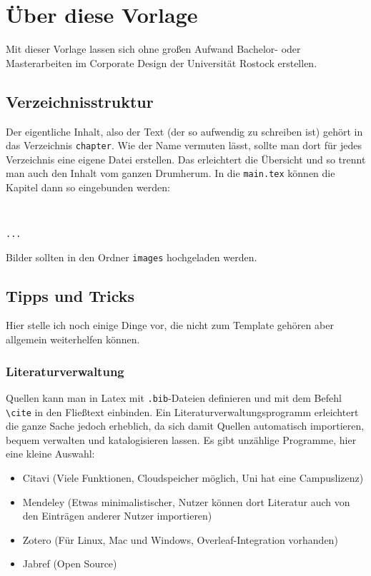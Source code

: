 \chapter{Über diese Vorlage}

Mit dieser Vorlage lassen sich ohne großen Aufwand Bachelor- oder Masterarbeiten im Corporate Design der Universität Rostock erstellen.
\section{Verzeichnisstruktur}
Der eigentliche Inhalt, also der Text (der so aufwendig zu schreiben ist) gehört in das Verzeichnis \texttt{chapter}. Wie der Name vermuten lässt, sollte man dort für jedes Verzeichnis eine eigene Datei erstellen. Das erleichtert die Übersicht und so trennt man auch den Inhalt vom ganzen Drumherum. In die \texttt{main.tex} können die Kapitel dann so eingebunden werden:

\begin{lstlisting}


...

\end{lstlisting}

Bilder sollten in den Ordner \texttt{images} hochgeladen werden.

\section{Tipps und Tricks}
Hier stelle ich noch einige Dinge vor, die nicht zum Template gehören aber allgemein weiterhelfen können.

\subsection{Literaturverwaltung}
Quellen kann man in Latex mit \texttt{.bib}-Dateien definieren und mit dem Befehl \texttt{\textbackslash{}cite} \cite{iuk696} in den Fließtext einbinden. Ein Literaturverwaltungsprogramm erleichtert die ganze Sache jedoch erheblich, da sich damit Quellen automatisch importieren, bequem verwalten und katalogisieren lassen. Es gibt unzählige Programme, hier eine kleine Auswahl:

\begin{itemize}
    \item Citavi (Viele Funktionen, Cloudspeicher möglich, Uni hat eine Campuslizenz)
    \item Mendeley (Etwas minimalistischer, Nutzer können dort Literatur auch von den Einträgen anderer Nutzer importieren)
    \item Zotero (Für Linux, Mac und Windows, Overleaf-Integration vorhanden)
    \item Jabref (Open Source)
\end{itemize}

